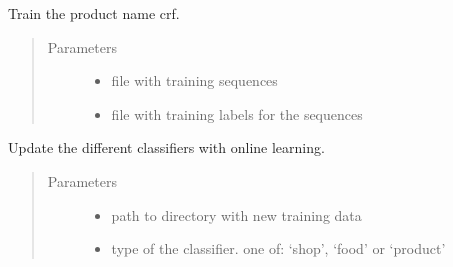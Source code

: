 \documentclass[letterpaper,10pt,english]{sphinxmanual}
\begin{document}
\begin{fulllineitems}
\label{\detokenize{api:backend.train_product_name}}
Train the product name crf.
\begin{quote}\begin{description}
\item[{Parameters}] \leavevmode\begin{itemize}
\item {} 
 \textendash{} file with training sequences

\item {} 
 \textendash{} file with training labels for the sequences

\end{itemize}

\end{description}\end{quote}

\end{fulllineitems}


\begin{fulllineitems}
\label{\detokenize{api:backend.update_clf}}
Update the different classifiers with online learning.
\begin{quote}\begin{description}
\item[{Parameters}] \leavevmode\begin{itemize}
\item {} 
 \textendash{} path to directory with new training data

\item {} 
 \textendash{} type of the classifier. one of: ‘shop’, ‘food’ or ‘product’

\end{itemize}

\end{description}\end{quote}

\end{fulllineitems}
\end{document}
